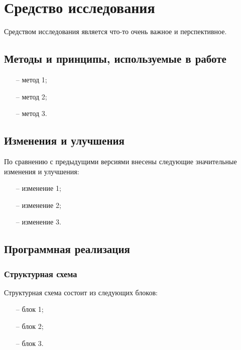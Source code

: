 \newpage
\section{Средство исследования}\label{section:Средство}

Средством исследования является что-то очень важное и перспективное.

\subsection{Методы и принципы, используемые в работе}

\begin{enumerate}
	\item[--] метод 1; 
	\item[--] метод 2; 
	\item[--] метод 3. 
\end{enumerate}
\subsection{Изменения и улучшения}

По сравнению с предыдущими версиями внесены следующие значительные изменения и улучшения:
\begin{enumerate}
	\item[--] изменение 1;
	\item[--] изменение 2;
	\item[--] изменение 3.
\end{enumerate}	

\subsection{Программная реализация}
\subsubsection{Структурная схема}

Структурная схема состоит из следующих блоков:
\begin{enumerate}
	\item[--] блок 1;
	\item[--] блок 2;
	\item[--] блок 3.
\end{enumerate}

